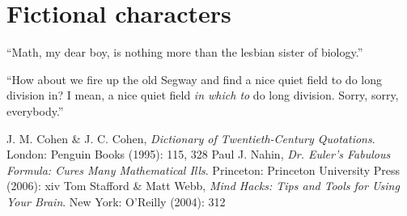 \documentclass[12pt]{article}
\begin{document}
\section{Fictional characters}

``Math, my dear boy, is nothing more than the lesbian sister of biology.''\\

``How about we fire up the old Segway and find a nice quiet field to do long division in? I mean, a nice quiet field {\em in which to} do long division. Sorry, sorry, everybody.''\\

\begin{thebibliography}{5}
 J. M. Cohen \& J. C. Cohen, {\it Dictionary of Twentieth-Century Quotations}. London: Penguin Books (1995): 115, 328
 Paul J. Nahin, {\it Dr. Euler's Fabulous Formula: Cures Many Mathematical Ills}. Princeton: Princeton University Press (2006): xiv
 Tom Stafford \& Matt Webb, {\it Mind Hacks: Tips and Tools for Using Your Brain}. New York: O'Reilly (2004): 312 %
\end{thebibliography}
\end{document}
